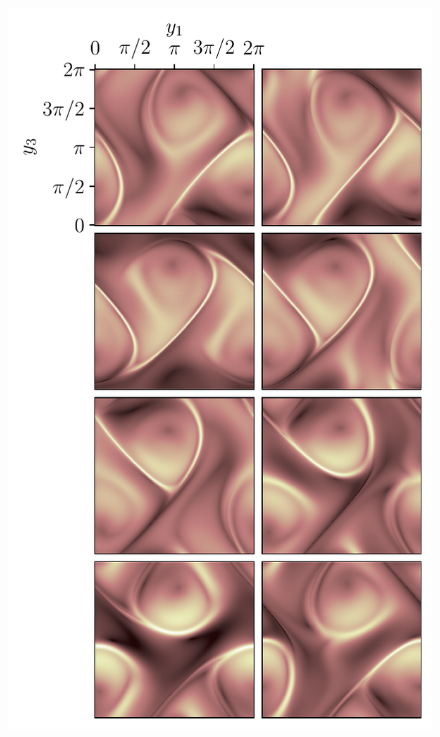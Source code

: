 \begin{landscape}
\begin{figure}
		\includegraphics[width=0.42\textheight]{chp04_paper_numerics/figures/gabc/S2_slices_xz}

\end{figure}
\end{landscape}
